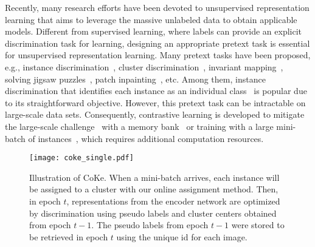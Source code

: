 \documentclass[10pt,twocolumn,letterpaper]{article}
\begin{document}
Recently, many research efforts have been devoted to unsupervised representation learning that aims to leverage the massive unlabeled data to obtain applicable models. Different from supervised learning, where labels can provide an explicit discrimination task for learning, designing an appropriate pretext task is essential for unsupervised representation learning. Many pretext tasks have been proposed, e.g., instance discrimination~\cite{DosovitskiyFSRB16}, cluster discrimination~\cite{CaronBJD18}, invariant mapping~\cite{ChenH21,GrillSATRBDPGAP20}, solving jigsaw puzzles~\cite{NorooziF16}, patch inpainting~\cite{PathakKDDE16}, etc. Among them, instance discrimination that identifies each instance as an individual class~\cite{DosovitskiyFSRB16} is popular due to its straightforward objective. However, this pretext task can be intractable on large-scale data sets. Consequently, contrastive learning is developed to mitigate the large-scale challenge~\cite{ChenK0H20,He0WXG20,WuXYL18} with a memory bank~\cite{He0WXG20} or training with a large mini-batch of instances~\cite{ChenK0H20}, which requires additional computation resources.



\begin{figure}[t]
\centering
\texttt{[image: coke\_single.pdf]}
\caption{Illustration of CoKe. When a mini-batch arrives, each instance will be assigned to a cluster with our online assignment method. Then, in epoch $t$, representations from the encoder network are optimized by discrimination using pseudo labels and cluster centers obtained from epoch $t-1$. The pseudo labels from epoch $t-1$ were stored to be retrieved in epoch $t$ using the unique id for each image.}\label{fig:illu}
\end{figure}
\end{document}
